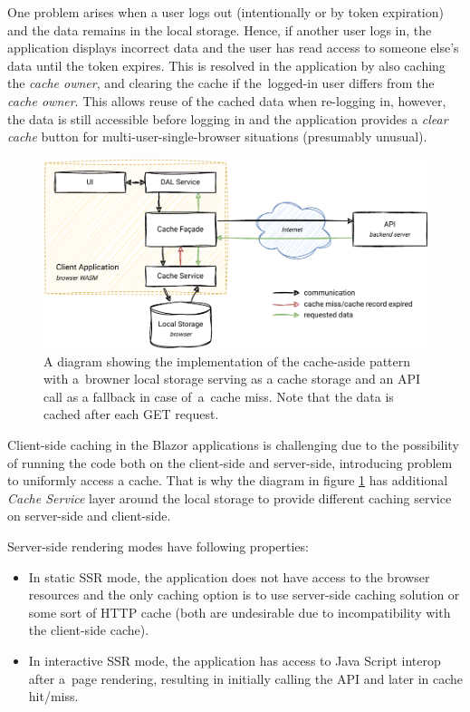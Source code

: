 One problem arises when a user logs out (intentionally or by token expiration) and the data remains in the local storage. Hence, if another user logs in, the application displays incorrect data and the user has read access to someone else's data until the token expires. This is resolved in the application by also caching the \textit{cache owner}, and clearing the cache if the~logged-in user differs from the \textit{cache owner}. This allows reuse of the cached data when re-logging in, however, the data is still accessible before logging in and the application provides a \textit{clear cache} button for multi-user-single-browser situations (presumably unusual).

\begin{figure} [H]
    \centering
    \includegraphics[width=\textwidth]{figures/cache.pdf}
    \caption{A diagram showing the implementation of the cache-aside pattern with a~browner local storage serving as a cache storage and an API call as a fallback in case of~a~cache miss. Note that the data is cached after each GET request.}
    \label{fig:cache}
\end{figure}

Client-side caching in the Blazor applications is challenging due to the possibility of running the code both on the client-side and server-side, introducing problem to uniformly access a cache. That is why the diagram in figure \ref{fig:cache} has additional \textit{Cache Service} layer around the local storage to provide different caching service on server-side and client-side.

Server-side rendering modes have following properties:
\begin{itemize}
    \item In static SSR mode, the application does not have access to the browser resources and the only caching option is to use server-side caching solution or some sort of HTTP cache (both are undesirable due to incompatibility with the client-side cache).

    \item In interactive SSR mode, the application has access to Java Script interop after a~page rendering, resulting in initially calling the API and later in cache hit/miss.
\end{itemize}

